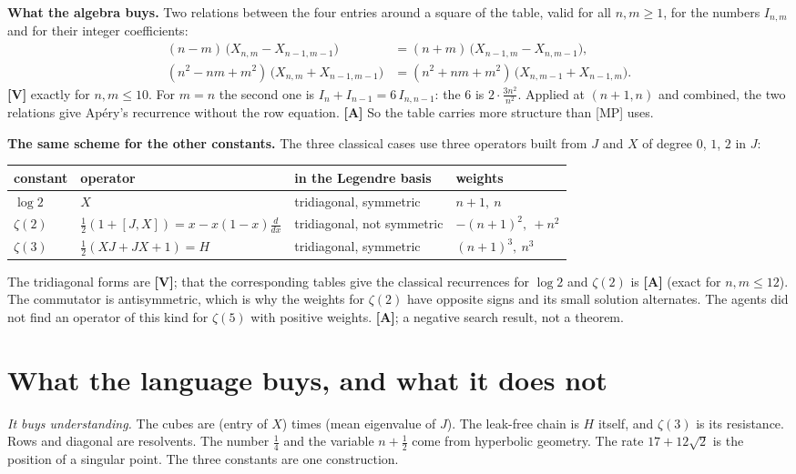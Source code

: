 \documentclass[11pt]{article}
\newcommand{\q}[1]{\medskip\noindent\textbf{#1}}
\begin{document}
\q{What the algebra buys.} Two relations between the four entries around a square of the table,
valid for all $n,m\ge1$, for the numbers $I_{n,m}$ and for their integer coefficients:
\begin{align*}
(n-m)\,\bigl(X_{n,m}-X_{n-1,m-1}\bigr)&=(n+m)\,\bigl(X_{n-1,m}-X_{n,m-1}\bigr),\\
(n^2-nm+m^2)\,\bigl(X_{n,m}+X_{n-1,m-1}\bigr)&=(n^2+nm+m^2)\,\bigl(X_{n,m-1}+X_{n-1,m}\bigr).
\end{align*}
\textbf{[V]} exactly for $n,m\le10$. For $m=n$ the second one is $I_n+I_{n-1}=6\,I_{n,n-1}$: the $6$
is $2\cdot\frac{3n^2}{n^2}$. Applied at $(n+1,n)$ and combined, the two relations give Ap\'ery's
recurrence without the row equation. \textbf{[A]} So the table carries more structure than [MP]
uses.

\q{The same scheme for the other constants.} The three classical cases use three operators built
from $J$ and $X$ of degree $0$, $1$, $2$ in $J$:
\begin{center}
\begin{tabular}{@{}llll@{}}
\toprule
constant & operator & in the Legendre basis & weights\\
\midrule
$\log2$ & $X$ & tridiagonal, symmetric & $n+1,\ n$\\
$\zeta(2)$ & $\frac12(1+[J,X])=x-x(1-x)\frac d{dx}$ & tridiagonal, not symmetric & $-(n+1)^2,\ +n^2$\\
$\zeta(3)$ & $\frac12(XJ+JX+1)=H$ & tridiagonal, symmetric & $(n+1)^3,\ n^3$\\
\bottomrule
\end{tabular}
\end{center}
The tridiagonal forms are \textbf{[V]}; that the corresponding tables give the classical
recurrences for $\log2$ and $\zeta(2)$ is \textbf{[A]} (exact for $n,m\le12$). The commutator is
antisymmetric, which is why the weights for $\zeta(2)$ have opposite signs and its small solution
alternates. The agents did not find an operator of this kind for $\zeta(5)$ with positive weights.
\textbf{[A]}; a negative search result, not a theorem.

\section{What the language buys, and what it does not}

\emph{It buys understanding.} The cubes are (entry of $X$) times (mean eigenvalue of $J$). The
leak-free chain is $H$ itself, and $\zeta(3)$ is its resistance. Rows and diagonal are resolvents.
The number $\frac14$ and the variable $n+\frac12$ come from hyperbolic geometry. The rate
$17+12\sqrt2$ is the position of a singular point. The three constants are one construction.
\end{document}
